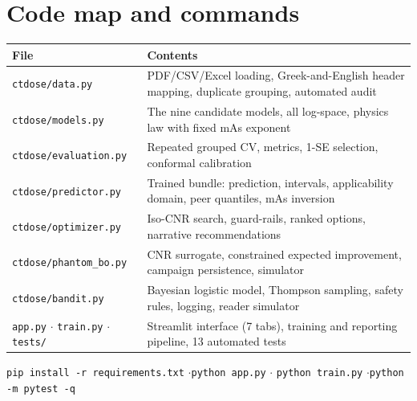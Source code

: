 \documentclass[10pt,a4paper]{article}
\newcommand{\hdr}{\rowcolor{ctsurf}}
\begin{document}
\section{Code map and commands}
\begin{table}[h]\footnotesize
\begin{tabularx}{\linewidth}{@{}l L@{}}
\toprule
\hdr \textbf{File} & \textbf{Contents}\\
\midrule
\texttt{ctdose/data.py} & PDF/CSV/Excel loading, Greek-and-English header mapping, duplicate grouping, automated audit\\
\texttt{ctdose/models.py} & The nine candidate models, all log-space, physics law with fixed mAs exponent\\
\texttt{ctdose/evaluation.py} & Repeated grouped CV, metrics, 1-SE selection, conformal calibration\\
\texttt{ctdose/predictor.py} & Trained bundle: prediction, intervals, applicability domain, peer quantiles, mAs inversion\\
\texttt{ctdose/optimizer.py} & Iso-CNR search, guard-rails, ranked options, narrative recommendations\\
\texttt{ctdose/phantom\_bo.py} & CNR surrogate, constrained expected improvement, campaign persistence, simulator\\
\texttt{ctdose/bandit.py} & Bayesian logistic model, Thompson sampling, safety rules, logging, reader simulator\\
\texttt{app.py} $\cdot$ \texttt{train.py} $\cdot$ \texttt{tests/} & Streamlit interface (7 tabs), training and reporting pipeline, 13 automated tests\\
\bottomrule
\end{tabularx}
\end{table}

\begin{eqbox}
\texttt{pip install -r requirements.txt} \quad$\cdot$\quad \texttt{python app.py} \quad$\cdot$\quad
\texttt{python train.py} \quad$\cdot$\quad \texttt{python -m pytest -q}
\end{eqbox}
\end{document}
